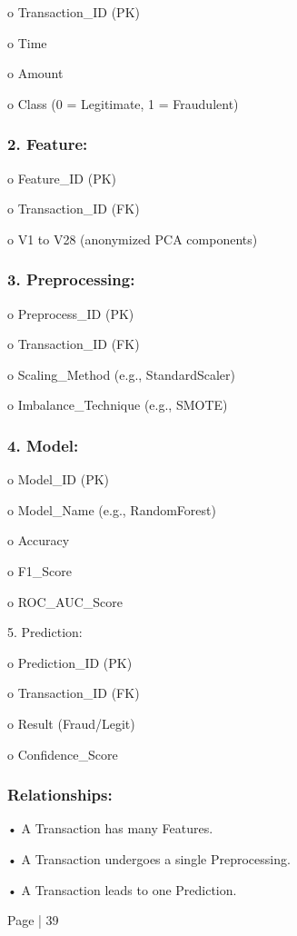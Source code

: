 \documentclass[11pt,a4paper]{article}
\begin{document}
o Transaction\_ID (PK) 

o Time 

o Amount 

o Class (0 = Legitimate, 1 = Fraudulent) 

\subsubsection*{2. Feature: }

o Feature\_ID (PK) 

o Transaction\_ID (FK) 

o V1 to V28 (anonymized PCA components) 

\subsubsection*{3. Preprocessing: }

o Preprocess\_ID (PK) 

o Transaction\_ID (FK) 

o Scaling\_Method (e.g., StandardScaler) 

o Imbalance\_Technique (e.g., SMOTE) 

\subsubsection*{4. Model: }

o Model\_ID (PK) 

o Model\_Name (e.g., RandomForest) 

o Accuracy 

o F1\_Score 

o ROC\_AUC\_Score 

5. Prediction: 

o Prediction\_ID (PK) 

o Transaction\_ID (FK) 

o Result (Fraud/Legit) 

o Confidence\_Score 

\subsubsection*{Relationships: }

• 
A Transaction has many Features. 

• 
A Transaction undergoes a single Preprocessing. 

• 
A Transaction leads to one Prediction. 

Page | 39  
\end{document}
